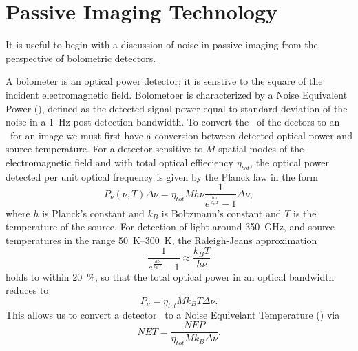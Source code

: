 \section{Passive Imaging Technology}

It is useful to begin with a discussion of noise in passive imaging from the perspective of bolometric detectors.

A bolometer is an optical power detector; it is senstive to the square of the incident electromagnetic field.
Bolometoer is characterized by a Noise Equivalent Power (\NEP), defined as the detected signal power equal to standard deviation of the noise in a \SI{1}{\Hz} post-detection bandwidth.
To convert the \NEP\ of the dectors to an \NETD\ for an image we must first have a conversion between detected optical power and source temperature.
For a detector sensitive to $M$ spatial modes of the electromagnetic field and with total optical effieciency $\eta_{tot}$, the optical power detected per unit optical frequency is given by the Planck law in the form
\begin{equation} \label{eqn:ch1-planck}
  P_{\nu}(\nu,T) \Delta \nu = \eta_{tot} M h \nu \frac{1}{e^{\frac{h \nu}{k_B T}} - 1} \Delta \nu,
\end{equation}
where $h$ is Planck's constant and $k_B$ is Boltzmann's constant and $T$ is the temperature of the source.
For detection of light around \SI{350}{\GHz}, and source temperatures in the range \SIrange{50}{300}{\K}, the Raleigh-Jeans approximation
\begin{equation}
  \frac{1}{e^{\frac{h \nu}{k_B T}} - 1} \approx \frac{k_B T}{h \nu}
\end{equation}
holds to within \SI{20}{\percent}, so that the total optical power in an optical bandwidth reduces to 
\begin{equation}
  P_{\nu} = \eta_{tot} M k_B T \Delta \nu.
\end{equation}
This allows us to convert a detector \NEP\ to a Noise Equivelant Temperature (\NET) via
\begin{equation}
  NET = \frac{NEP}{\eta_{tot} M k_B \Delta \nu}.
\end{equation}

